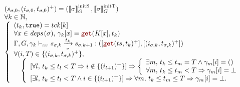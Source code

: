 \begin{skippableproof}
\begin{itemize}
\begin{itemize}
                        \begin{equation*}
                            \begin{array}{l}
                                (s_{\sigma, 0}, (i_{\sigma, 0}, t_{\sigma, 0})^+) = (\initstate{\sigma}, \inittimer{\sigma}) \\
                                \forall k \in \N, \,                                                                         \\
                                \left\{
                                \begin{array}{l}
                                    (t_k, \true) = \tck[k]                                            \\
                                    \forall x \in \depSet{\sigma}, \, \gamma_k[x] = \getAt{K[x]}{t_k} \\
                                    \sigmaOpSem{\gamma_k}{s_{\sigma, k}}{\sigma}{t_k}{s_{\sigma, k+1}}{\getAt{\ts}{t_k}^+}
                                    {(i_{\sigma, k}, t_{\sigma, k})^+}                                \\
                                    \forall (i, T) \in \{(i_{\sigma, k}, t_{\sigma, k})^+\},          \\
                                    \quad
                                    \left\{
                                    \begin{array}{l}
                                        \left[\forall l, \, t_k \le t_l < T \Rightarrow i \notin \{(i_{l+1})^+\} \right]
                                        \Rightarrow
                                        \left\{\begin{array}{l}
                                                   \exists m, \, t_k \le t_m = T \wedge \gamma_m[i] = () \\
                                                   \forall m, \, t_k \le t_m < T \Rightarrow \gamma_m[i] = \bot
                                               \end{array}\right.          \\
                                        \left[\exists l, \, t_k \le t_l < T \wedge i \in \{(i_{l+1})^+\} \right]
                                        \Rightarrow \forall m, \, t_k \le t_m \le T \Rightarrow \gamma_m[i] = \bot. \\
                                    \end{array}
                                    \right.                                                           \\
                                \end{array}
                                \right.
                            \end{array}
                        \end{equation*}


\end{itemize}
\end{itemize}
\end{skippableproof}
